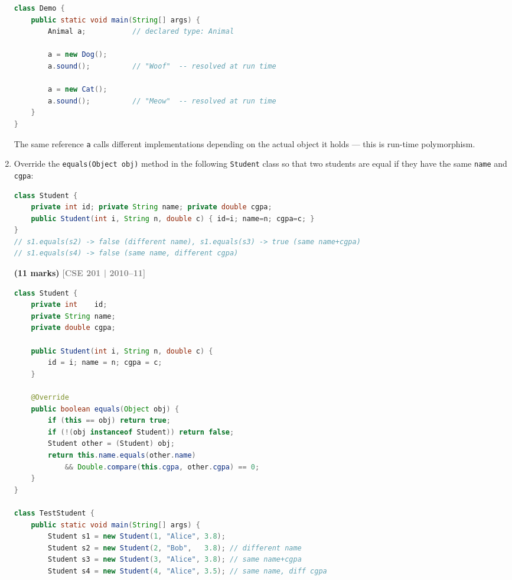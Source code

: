 \documentclass[12pt,a3paper]{article}
\newcommand{\yr}[1]{\hfill\textcolor{gray}{\small\textbf{[#1]}}}
\newcommand{\mk}[1]{\textcolor{orange!70!black}{\small\textbf{(#1 marks)}}}
\begin{document}
\begin{enumerate}
\begin{tcolorbox}[enhanced,breakable,ansbox,
  colback=cC!4,colframe=cC,boxrule=0.8pt,arc=5pt,
  title={\textbf{Answer --- Run-Time Polymorphism in Java}},
  fonttitle=\bfseries\color{white},colbacktitle=cC]
\begin{lstlisting}[language=Java]
class Demo {
    public static void main(String[] args) {
        Animal a;           // declared type: Animal

        a = new Dog();
        a.sound();          // "Woof"  -- resolved at run time

        a = new Cat();
        a.sound();          // "Meow"  -- resolved at run time
    }
}
\end{lstlisting}

The same reference \texttt{a} calls different implementations depending
on the actual object it holds --- this is run-time polymorphism.
\end{tcolorbox}

\item Override the \texttt{equals(Object obj)} method in the following \texttt{Student} class so that two students are equal if they have the same \texttt{name} and \texttt{cgpa}:
\begin{lstlisting}[language=Java]
class Student {
    private int id; private String name; private double cgpa;
    public Student(int i, String n, double c) { id=i; name=n; cgpa=c; }
}
// s1.equals(s2) -> false (different name), s1.equals(s3) -> true (same name+cgpa)
// s1.equals(s4) -> false (same name, different cgpa)
\end{lstlisting}
\mk{11}
\yr{CSE 201 | 2010--11}

\begin{tcolorbox}[enhanced,breakable,ansbox,
  colback=cC!4,colframe=cC,boxrule=0.8pt,arc=5pt,
  title={\textbf{Answer --- Overriding \texttt{equals()} in Student}},
  fonttitle=\bfseries\color{white},colbacktitle=cC]
\begin{lstlisting}[language=Java]
class Student {
    private int    id;
    private String name;
    private double cgpa;

    public Student(int i, String n, double c) {
        id = i; name = n; cgpa = c;
    }

    @Override
    public boolean equals(Object obj) {
        if (this == obj) return true;
        if (!(obj instanceof Student)) return false;
        Student other = (Student) obj;
        return this.name.equals(other.name)
            && Double.compare(this.cgpa, other.cgpa) == 0;
    }
}

class TestStudent {
    public static void main(String[] args) {
        Student s1 = new Student(1, "Alice", 3.8);
        Student s2 = new Student(2, "Bob",   3.8); // different name
        Student s3 = new Student(3, "Alice", 3.8); // same name+cgpa
        Student s4 = new Student(4, "Alice", 3.5); // same name, diff cgpa


\end{lstlisting}
\end{tcolorbox}
\end{enumerate}
\end{document}
